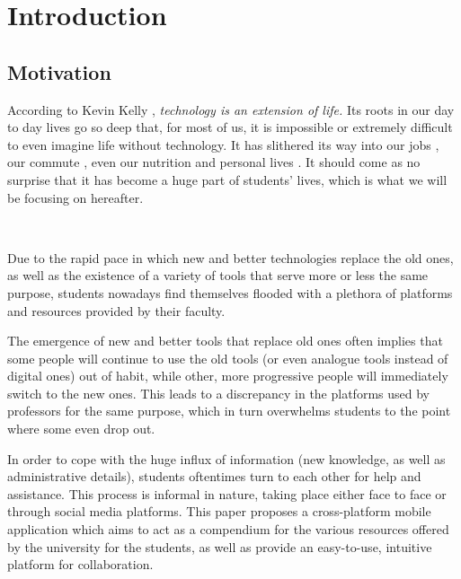 \chapter{Introduction} \label{chapter1}

\section{Motivation} \label{1:motivation}

    According to Kevin Kelly \cite{kelly2010technology}, \textit{technology is an extension of life.} Its roots in our day to day lives go so deep that, for most of us, it is impossible or extremely difficult to even imagine life without technology. It has slithered its way into our jobs \cite{lewis1996studying}, our commute \cite{kairi2019technology}, even our nutrition \cite{lewis2010role} and personal lives \cite{mcquillen2003influence}. It should come as no surprise that it has become a huge part of students' lives, which is what we will be focusing on hereafter.
    
    ~
    
    Due to the rapid pace in which new and better technologies replace the old ones, as well as the existence of a variety of tools that serve more or less the same purpose, students nowadays find themselves flooded with a plethora of platforms and resources provided by their faculty.
    
    The emergence of new and better tools that replace old ones often implies that some people will continue to use the old tools (or even analogue tools instead of digital ones) out of habit, while other, more progressive people will immediately switch to the new ones. This leads to a discrepancy in the platforms used by professors for the same purpose, which in turn overwhelms students to the point where some even drop out.
    
    In order to cope with the huge influx of information (new knowledge, as well as administrative details), students oftentimes turn to each other for help and assistance. This process is informal in nature, taking place either face to face or through social media platforms.
    \clearpage
    This paper proposes a cross-platform mobile application which aims to act as a compendium for the various resources offered by the university for the students, as well as provide an easy-to-use, intuitive platform for collaboration.

